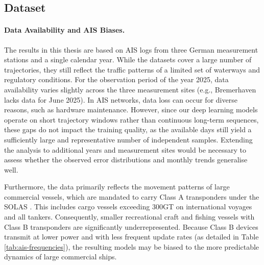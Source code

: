 \subsection*{Dataset}

\paragraph{Data Availability and AIS Biases.}
The results in this thesis are based on \ac{AIS} logs from three German measurement stations and a single calendar year. While the datasets cover a large number of trajectories, they still reflect the traffic patterns of a limited set of waterways and regulatory conditions. For the observation period of the year 2025, %
data availability varies slightly across the three measurement sites (e.g., Bremerhaven lacks data for June 2025).
In AIS networks, data loss can occur for diverse reasons, such as hardware maintenance.
However, since our deep learning models operate on short trajectory windows rather than continuous long-term sequences, these gaps do not impact the training quality, as the available days still yield a sufficiently large and representative number of independent samples.
Extending the analysis to additional years and measurement sites would be necessary to assess whether the observed error distributions and monthly trends generalise well. 

Furthermore, the data primarily reflects the movement patterns of large commercial vessels, which are mandated to carry Class A transponders under the \ac{SOLAS} \parencite{solas2014}. This includes cargo vessels exceeding 300GT on international voyages and all tankers. Consequently, smaller recreational craft and fishing vessels with Class B transponders are significantly underrepresented. Because Class B devices transmit at lower power and with less frequent update rates (as detailed in Table \ref{tab:ais-frequencies}), the resulting models may be biased to the more predictable dynamics of large commercial ships.

